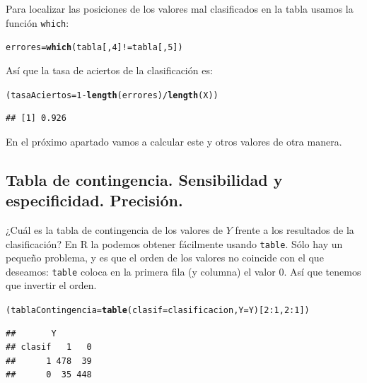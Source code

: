 \documentclass[10pt,a4paper]{article}\usepackage[]{graphicx}\usepackage[]{color}
\makeatletter
\newcommand{\hlnum}[1]{\textcolor[rgb]{0.686,0.059,0.569}{#1}}%
\newcommand{\hlopt}[1]{\textcolor[rgb]{0,0,0}{#1}}%
\newcommand{\hlstd}[1]{\textcolor[rgb]{0.345,0.345,0.345}{#1}}%
\newcommand{\hlkwb}[1]{\textcolor[rgb]{0.69,0.353,0.396}{#1}}%
\newcommand{\hlkwc}[1]{\textcolor[rgb]{0.333,0.667,0.333}{#1}}%
\newcommand{\hlkwd}[1]{\textcolor[rgb]{0.737,0.353,0.396}{\textbf{#1}}}%
\newenvironment{kframe}{%
 \def\at@end@of@kframe{}%
 \ifinner\ifhmode%
  \def\at@end@of@kframe{\end{minipage}}%
  \begin{minipage}{\columnwidth}%
 \fi\fi%
 \def\FrameCommand##1{\hskip\@totalleftmargin \hskip-\fboxsep
 \colorbox{shadecolor}{##1}\hskip-\fboxsep
     \hskip-\linewidth \hskip-\@totalleftmargin \hskip\columnwidth}%
 \MakeFramed {\advance\hsize-\width
   \@totalleftmargin\z@ \linewidth\hsize
   \@setminipage}}%
 {\par\unskip\endMakeFramed%
 \at@end@of@kframe}
\newenvironment{knitrout}{}{} %
\newcounter {cont01}
\makeatother
\begin{document}
Para localizar las posiciones de los valores mal clasificados en la tabla usamos la función {\tt which}:

\begin{knitrout}
\color{fgcolor}\begin{kframe}
\begin{alltt}
\hlstd{errores} \hlkwb{=} \hlkwd{which}\hlstd{(tabla[ ,} \hlnum{4}\hlstd{]} \hlopt{!=} \hlstd{tabla[ ,} \hlnum{5}\hlstd{] )}
\end{alltt}
\end{kframe}
\end{knitrout}

Así que la tasa de aciertos de la clasificación es:


\begin{knitrout}
\color{fgcolor}\begin{kframe}
\begin{alltt}
\hlstd{(tasaAciertos} \hlkwb{=} \hlnum{1} \hlopt{-} \hlkwd{length}\hlstd{(errores)} \hlopt{/} \hlkwd{length}\hlstd{(X))}
\end{alltt}
\begin{verbatim}
## [1] 0.926
\end{verbatim}
\end{kframe}
\end{knitrout}

En el próximo apartado vamos a calcular este y otros valores de otra manera.

\subsection{Tabla de contingencia. Sensibilidad y especificidad. Precisión.}
\label{tut13:subsec:TablaContingenciaSensibilidadEspecificidad}

¿Cuál es la tabla de contingencia de los valores de $Y$ frente a los resultados de la clasificación? En R la podemos obtener fácilmente usando {\tt table}. Sólo hay un pequeño problema,  y es que el orden de los valores no coincide con el que deseamos: {\tt table} coloca en la primera fila (y columna) el valor $0$. Así que tenemos que invertir el orden.

\begin{knitrout}
\color{fgcolor}\begin{kframe}
\begin{alltt}
\hlstd{(tablaContingencia} \hlkwb{=} \hlkwd{table}\hlstd{(}\hlkwc{clasif} \hlstd{= clasificacion,} \hlkwc{Y} \hlstd{= Y)[}\hlnum{2}\hlopt{:}\hlnum{1}\hlstd{,} \hlnum{2}\hlopt{:}\hlnum{1}\hlstd{])}
\end{alltt}
\begin{verbatim}
##       Y
## clasif   1   0
##      1 478  39
##      0  35 448
\end{verbatim}
\end{kframe}
\end{knitrout}
\end{document}
